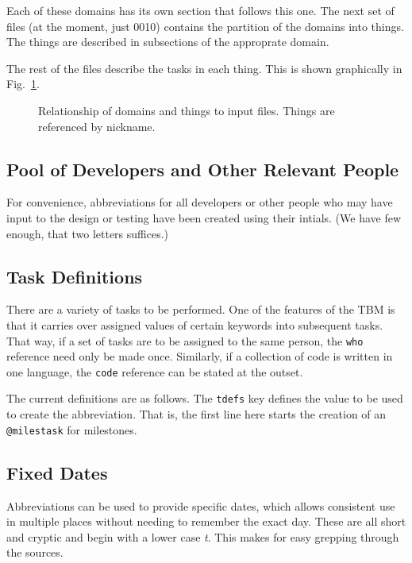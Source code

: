 Each of these domains has its own section that follows this one.
The next set of files (at the moment, just 0010) contains the partition
of the domains into things.  The things are described in subsections of
the approprate domain.

The rest of the files describe the tasks in each thing.  This is shown
graphically in Fig.~\ref{fig:umlclass}.
\begin{figure}[h!]%
\captionsetup{width=0.6\linewidth}
\caption[Input Files]{Relationship of domains and things to input files.
Things are referenced by nickname.}
\label{fig:umlclass}
\end{figure}

\subsection{Pool of Developers and Other Relevant People}

For convenience, abbreviations for all developers or other people who
may have input to the design or testing have been created using their
intials.   (We have few enough, that two letters suffices.)


\subsection{Task Definitions}

There are a variety of tasks to be performed.  One of the features
of the \ac{TBM} is that it carries over assigned values of certain
keywords into subsequent tasks.  That way, if a set of tasks are to
be assigned to the same person, the \texttt{who} reference need only
be made once.  Similarly, if a collection of code is written in one
language, the \texttt{code} reference can be stated at the outset.

The current definitions are as follows.  The \texttt{tdefs} key
defines the value to be used to create the abbreviation.  That is,
the first line here starts the creation of an \texttt{@milestask}
for milestones.


\subsection{Fixed Dates}

Abbreviations can be used to provide specific dates, which allows
consistent use in multiple places without needing to remember the
exact day.  These are all short and cryptic and begin with a lower
case \textit{t}.  This makes for easy grepping through the sources.


%
%
